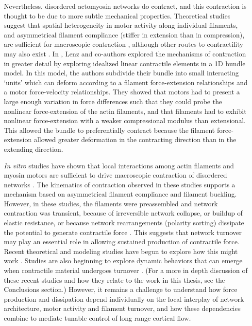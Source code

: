 Nevertheless, disordered actomyosin networks do contract, and this contraction is thought to be due to more subtle mechanical properties.  Theoretical studies suggest that spatial heterogeneity in motor activity along individual filaments, and asymmetrical filament compliance (stiffer in extension than in compression), are sufficient for macroscopic contraction \cite{1367-2630-14-3-033037,PhysRevX.4.041002}, although other routes to contractility may also exist \cite{PhysRevX.4.041002}.  In \cite{1367-2630-14-3-033037}, Lenz and co-authors explored the mechanisms of contraction in greater detail by exploring idealized linear contractile elements in a 1D bundle model.  In this model, the authors subdivide their bundle into small interacting ‘units’ which can deform according to a filament force-extension relationships and a motor force-velocity relationships. They showed that motors had to present a large enough variation in force differences such that they could probe the nonlinear force-extension of the actin filaments, and that filaments had to exhibit nonlinear force-extension with a weaker compressional modulus than extensional.  This allowed the bundle to preferentially contract because the filament force-extension allowed greater deformation in the contracting direction than in the extending direction.

{\em In vitro} studies have shown that local interactions among actin filaments and myosin motors are sufficient to drive macroscopic contraction of disordered networks \cite{rheo_2D1}.  The kinematics of contraction observed in these studies supports a mechanism based on asymmetrical filament compliance and filament buckling.  However, in these studies, the filaments were preassembled and network contraction was transient, because of irreversible network collapse\cite{Alvarado:2013aa}, or buildup of elastic resistance\cite{Murrell15062014}, or because network rearrangements (polarity sorting) dissipate the potential to generate contractile force \cite{Ennomani2016616, Reymann1310, Ndlec:1997aa,Surrey1167}. This suggests that network turnover may play an essential role in allowing sustained production of contractile force. Recent theoretical and modeling studies have begun to explore how this might work \cite{2015arXiv150706182H, Mak:2016aa, 10.1371/journal.pone.0000696}. Studies are also beginning to explore dynamic behaviors that can emerge when contractile material undergoes turnover \cite{PhysRevLett.103.058102,PhysRevLett.113.148102}. (For a more in depth discussion of these recent studies and how they relate to the work in this thesis, see the Conclusions section.) However, it remains a challenge to understand how force production and dissipation depend individually on the local interplay of network architecture, motor activity and filament turnover, and how these dependencies combine to mediate tunable control of long range cortical flow. 



